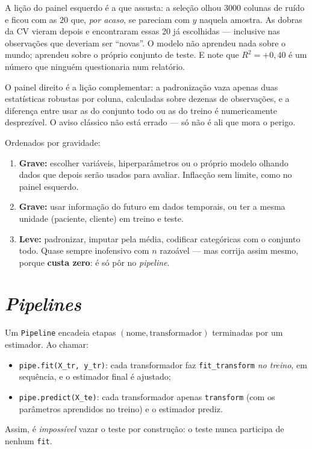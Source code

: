 \documentclass[11pt,a4paper]{article}
\begin{document}
\begin{ideia}
A lição do painel esquerdo é a que assusta: a seleção olhou $3000$ colunas de ruído
e ficou com as $20$ que, \emph{por acaso}, se pareciam com $y$ naquela amostra. As
dobras da CV vieram depois e encontraram essas 20 já escolhidas --- inclusive nas
observações que deveriam ser ``novas''. O modelo não aprendeu nada sobre o mundo;
aprendeu sobre o próprio conjunto de teste. E note que $R^2=+0{,}40$ é um número
que ninguém questionaria num relatório.

O painel direito é a lição complementar: a padronização vaza apenas duas
estatísticas robustas por coluna, calculadas sobre dezenas de observações, e a
diferença entre usar as do conjunto todo ou as do treino é numericamente
desprezível. O aviso clássico não está errado --- só não é ali que mora o perigo.
\end{ideia}

\begin{atencao}
Ordenados por gravidade:
\begin{enumerate}[leftmargin=1.6cm,nosep]
  \item \textbf{Grave:} escolher variáveis, hiperparâmetros ou o próprio modelo
        olhando dados que depois serão usados para avaliar. Inflacção sem limite,
        como no painel esquerdo.
  \item \textbf{Grave:} usar informação do futuro em dados temporais, ou ter a
        mesma unidade (paciente, cliente) em treino e teste.
  \item \textbf{Leve:} padronizar, imputar pela média, codificar categóricas com o
        conjunto todo. Quase sempre inofensivo com $n$ razoável --- mas corrija
        assim mesmo, porque \textbf{custa zero}: é só pôr no \emph{pipeline}.
\end{enumerate}
\end{atencao}

\section{\emph{Pipelines}}
Um \texttt{Pipeline} encadeia etapas $(\text{nome}, \text{transformador})$
terminadas por um estimador. Ao chamar:
\begin{itemize}[leftmargin=1.4cm,nosep]
  \item \texttt{pipe.fit(X\_tr, y\_tr)}: cada transformador faz \texttt{fit\_transform}
        \emph{no treino}, em sequência, e o estimador final é ajustado;
  \item \texttt{pipe.predict(X\_te)}: cada transformador apenas \texttt{transform}
        (com os parâmetros aprendidos no treino) e o estimador prediz.
\end{itemize}
Assim, é \emph{impossível} vazar o teste por construção: o teste nunca participa de
nenhum \texttt{fit}.
\end{document}
